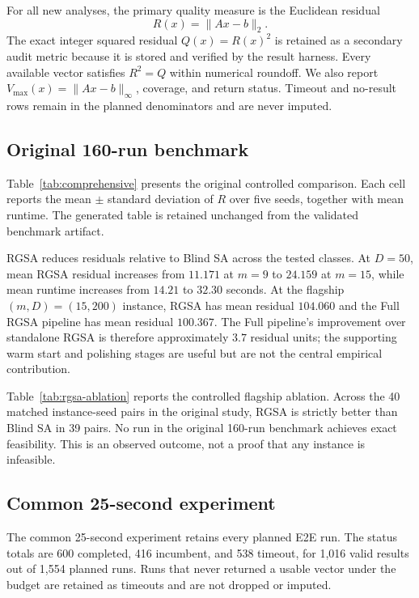\documentclass[11pt]{article}
\begin{document}
For all new analyses, the primary quality measure is the Euclidean residual
\begin{equation}
R(x)=\|Ax-b\|_2.
\end{equation}
The exact integer squared residual $Q(x)=R(x)^2$ is retained as a secondary audit metric because it is stored and verified by the result harness. Every available vector satisfies $R^2=Q$ within numerical roundoff. We also report $V_{\max}(x)=\|Ax-b\|_\infty$, coverage, and return status. Timeout and no-result rows remain in the planned denominators and are never imputed.

\subsection{Original 160-run benchmark}
Table~\ref{tab:comprehensive} presents the original controlled comparison. Each cell reports the mean $\pm$ standard deviation of $R$ over five seeds, together with mean runtime. The generated table is retained unchanged from the validated benchmark artifact.

RGSA reduces residuals relative to Blind SA across the tested classes. At $D=50$, mean RGSA residual increases from $11.171$ at $m=9$ to $24.159$ at $m=15$, while mean runtime increases from $14.21$ to $32.30$ seconds. At the flagship $(m,D)=(15,200)$ instance, RGSA has mean residual $104.060$ and the Full RGSA pipeline has mean residual $100.367$. The Full pipeline's improvement over standalone RGSA is therefore approximately $3.7$ residual units; the supporting warm start and polishing stages are useful but are not the central empirical contribution.

Table~\ref{tab:rgsa-ablation} reports the controlled flagship ablation. Across the 40 matched instance-seed pairs in the original study, RGSA is strictly better than Blind SA in 39 pairs. No run in the original 160-run benchmark achieves exact feasibility. This is an observed outcome, not a proof that any instance is infeasible.

\subsection{Common 25-second experiment}
The common 25-second experiment retains every planned E2E run. The status totals are 600 completed, 416 incumbent, and 538 timeout, for 1,016 valid results out of 1,554 planned runs. Runs that never returned a usable vector under the budget are retained as timeouts and are not dropped or imputed.
\end{document}
